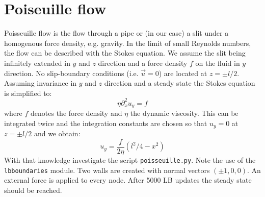 \section{Poiseuille flow \ES{}}
Poisseuille flow is the flow through a pipe or (in our case) a slit
under a homogenous force density, e.g. gravity. In the limit of small Reynolds
numbers, the flow can be described with the Stokes equation. 
We assume the slit being infinitely extended in $y$ and $z$ 
direction and a force density $f$ on the fluid 
in $y$ direction. No slip-boundary conditions  (i.e. $\vec{u}=0$)
are located at $z = \pm l/2$.
Assuming invariance in $y$ and $z$ direction and a steady state 
the Stokes equation is simplified to:
\begin{equation}
  \eta \partial_x^2 u_y = f
\end{equation}
where $f$ denotes the force density and $\eta$ the dynamic viscosity.
This can be integrated twice and the integration constants are chosen
so that $u_y=0$ at $z = \pm l/2$ and we obtain:
\begin{equation}
  u_y = \frac{f}{2\eta} \left(l^2/4-x^2\right)
\end{equation}
With that knowledge investigate the script \texttt{poisseuille.py}.
Note the use of the \texttt{lbboundaries} module. Two walls are created
with normal vectors $\left(\pm 1, 0, 0 \right)$. An external force
is applied to every node. After 5000 LB updates the steady state should
be reached.


